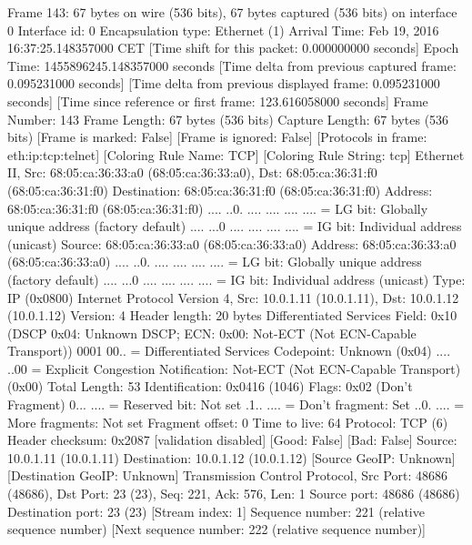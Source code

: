 Frame 143: 67 bytes on wire (536 bits), 67 bytes captured (536 bits) on interface 0
    Interface id: 0
    Encapsulation type: Ethernet (1)
    Arrival Time: Feb 19, 2016 16:37:25.148357000 CET
    [Time shift for this packet: 0.000000000 seconds]
    Epoch Time: 1455896245.148357000 seconds
    [Time delta from previous captured frame: 0.095231000 seconds]
    [Time delta from previous displayed frame: 0.095231000 seconds]
    [Time since reference or first frame: 123.616058000 seconds]
    Frame Number: 143
    Frame Length: 67 bytes (536 bits)
    Capture Length: 67 bytes (536 bits)
    [Frame is marked: False]
    [Frame is ignored: False]
    [Protocols in frame: eth:ip:tcp:telnet]
    [Coloring Rule Name: TCP]
    [Coloring Rule String: tcp]
Ethernet II, Src: 68:05:ca:36:33:a0 (68:05:ca:36:33:a0), Dst: 68:05:ca:36:31:f0 (68:05:ca:36:31:f0)
    Destination: 68:05:ca:36:31:f0 (68:05:ca:36:31:f0)
        Address: 68:05:ca:36:31:f0 (68:05:ca:36:31:f0)
        .... ..0. .... .... .... .... = LG bit: Globally unique address (factory default)
        .... ...0 .... .... .... .... = IG bit: Individual address (unicast)
    Source: 68:05:ca:36:33:a0 (68:05:ca:36:33:a0)
        Address: 68:05:ca:36:33:a0 (68:05:ca:36:33:a0)
        .... ..0. .... .... .... .... = LG bit: Globally unique address (factory default)
        .... ...0 .... .... .... .... = IG bit: Individual address (unicast)
    Type: IP (0x0800)
Internet Protocol Version 4, Src: 10.0.1.11 (10.0.1.11), Dst: 10.0.1.12 (10.0.1.12)
    Version: 4
    Header length: 20 bytes
    Differentiated Services Field: 0x10 (DSCP 0x04: Unknown DSCP; ECN: 0x00: Not-ECT (Not ECN-Capable Transport))
        0001 00.. = Differentiated Services Codepoint: Unknown (0x04)
        .... ..00 = Explicit Congestion Notification: Not-ECT (Not ECN-Capable Transport) (0x00)
    Total Length: 53
    Identification: 0x0416 (1046)
    Flags: 0x02 (Don't Fragment)
        0... .... = Reserved bit: Not set
        .1.. .... = Don't fragment: Set
        ..0. .... = More fragments: Not set
    Fragment offset: 0
    Time to live: 64
    Protocol: TCP (6)
    Header checksum: 0x2087 [validation disabled]
        [Good: False]
        [Bad: False]
    Source: 10.0.1.11 (10.0.1.11)
    Destination: 10.0.1.12 (10.0.1.12)
    [Source GeoIP: Unknown]
    [Destination GeoIP: Unknown]
Transmission Control Protocol, Src Port: 48686 (48686), Dst Port: 23 (23), Seq: 221, Ack: 576, Len: 1
    Source port: 48686 (48686)
    Destination port: 23 (23)
    [Stream index: 1]
    Sequence number: 221    (relative sequence number)
    [Next sequence number: 222    (relative sequence number)]
